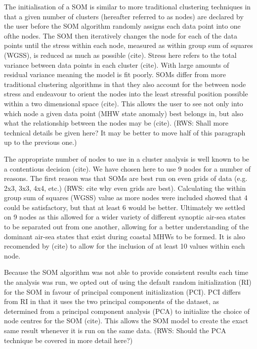 \documentclass[a4paper,10pt,review]{elsarticle}
\begin{document}
The initialisation of a SOM is similar to more traditional clustering techniques in that a given number of clusters (hereafter referred to as nodes) are declared by the user before the SOM algorithm randomly assigns each data point into one ofthe nodes. The SOM then iteratively changes the node for each of the data points until the stress within each node, measured as within group sum of squares (WGSS), is reduced as much as possible (cite). Stress here refers to the total variance between data points in each cluster (cite). With large amounts of residual variance meaning the model is fit poorly. SOMs differ from more traditional clustering algorithms in that they also account for the between node stress and endeavour to orient the nodes into the least stressful position possible within a two dimensional space (cite). This allows the user to see not only into which node a given data point (MHW state anomaly) best belongs in, but also what the relationship between the nodes may be (cite). (RWS: Shall more technical details be given here? It may be better to move half of this paragraph up to the previous one.)

The appropriate number of nodes to use in a cluster analysis is well known to be a contentious decision (cite). We have chosen here to use 9 nodes for a number of reasons. The first reason was that SOMs are best run on even grids of data (e.g. 2x3, 3x3, 4x4, etc.) (RWS: cite why even grids are best). Calculating the within group sum of squares (WGSS) value as more nodes were included showed that 4 could be satisfactory, but that at least 6 would be better. Ultimately we settled on 9 nodes as this allowed for a wider variety of different synoptic air-sea states to be separated out from one another, allowing for a better understanding of the dominant air-sea states that exist during coastal MHWs to be formed. It is also recomended by (cite) to allow for the inclusion of at least 10 values within each node.

Because the SOM algorithm was not able to provide consistent results each time the analysis was run, we opted out of using the default random initialization (RI) for the SOM in favour of principal component initialization (PCI). PCI differs from RI in that it uses the two principal components of the dataset, as determined from a principal component analysis (PCA) to initialize the choice of node centres for the SOM (cite). This allows the SOM model to create the exact same result whenever it is run on the same data. (RWS: Should the PCA technique be covered in more detail here?)
\end{document}
